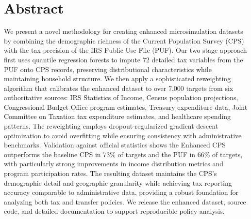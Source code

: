 \section*{Abstract}

We present a novel methodology for creating enhanced microsimulation datasets by combining the demographic richness of the Current Population Survey (CPS) with the tax precision of the IRS Public Use File (PUF). Our two-stage approach first uses quantile regression forests to impute 72 detailed tax variables from the PUF onto CPS records, preserving distributional characteristics while maintaining household structure. We then apply a sophisticated reweighting algorithm that calibrates the enhanced dataset to over 7,000 targets from six authoritative sources: IRS Statistics of Income, Census population projections, Congressional Budget Office program estimates, Treasury expenditure data, Joint Committee on Taxation tax expenditure estimates, and healthcare spending patterns. The reweighting employs dropout-regularized gradient descent optimization to avoid overfitting while ensuring consistency with administrative benchmarks. Validation against official statistics shows the Enhanced CPS outperforms the baseline CPS in 73\% of targets and the PUF in 66\% of targets, with particularly strong improvements in income distribution metrics and program participation rates. The resulting dataset maintains the CPS's demographic detail and geographic granularity while achieving tax reporting accuracy comparable to administrative data, providing a robust foundation for analyzing both tax and transfer policies. We release the enhanced dataset, source code, and detailed documentation to support reproducible policy analysis.